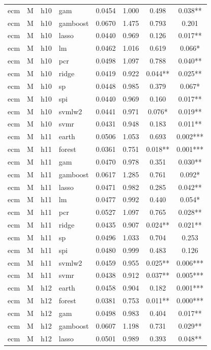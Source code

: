 \begin{ThreePartTable}
\begin{longtable}[t]{llclcccc}
ecm & M & h10 & gam & 0.0454 & 1.000 & 0.498 & 0.038**\\
ecm & M & h10 & gamboost & 0.0670 & 1.475 & 0.793 & 0.201\\
ecm & M & h10 & lasso & 0.0440 & 0.969 & 0.126 & 0.017**\\
ecm & M & h10 & lm & 0.0462 & 1.016 & 0.619 & 0.066*\\
ecm & M & h10 & pcr & 0.0498 & 1.097 & 0.788 & 0.040**\\
ecm & M & h10 & ridge & 0.0419 & 0.922 & 0.044** & 0.025**\\
ecm & M & h10 & sp & 0.0448 & 0.985 & 0.379 & 0.067*\\
ecm & M & h10 & spi & 0.0440 & 0.969 & 0.160 & 0.017**\\
ecm & M & h10 & svmlw2 & 0.0441 & 0.971 & 0.076* & 0.019**\\
ecm & M & h10 & svmr & 0.0431 & 0.948 & 0.183 & 0.011**\\
\addlinespace
ecm & M & h11 & earth & 0.0506 & 1.053 & 0.693 & 0.002***\\
ecm & M & h11 & forest & 0.0361 & 0.751 & 0.018** & 0.001***\\
ecm & M & h11 & gam & 0.0470 & 0.978 & 0.351 & 0.030**\\
ecm & M & h11 & gamboost & 0.0617 & 1.285 & 0.761 & 0.092*\\
ecm & M & h11 & lasso & 0.0471 & 0.982 & 0.285 & 0.042**\\
ecm & M & h11 & lm & 0.0477 & 0.992 & 0.440 & 0.054*\\
ecm & M & h11 & pcr & 0.0527 & 1.097 & 0.765 & 0.028**\\
ecm & M & h11 & ridge & 0.0435 & 0.907 & 0.024** & 0.021**\\
ecm & M & h11 & sp & 0.0496 & 1.033 & 0.704 & 0.253\\
ecm & M & h11 & spi & 0.0480 & 0.999 & 0.483 & 0.126\\
ecm & M & h11 & svmlw2 & 0.0459 & 0.955 & 0.025** & 0.006***\\
ecm & M & h11 & svmr & 0.0438 & 0.912 & 0.037** & 0.005***\\
\addlinespace
ecm & M & h12 & earth & 0.0458 & 0.904 & 0.182 & 0.001***\\
ecm & M & h12 & forest & 0.0381 & 0.753 & 0.011** & 0.000***\\
ecm & M & h12 & gam & 0.0498 & 0.983 & 0.404 & 0.017**\\
ecm & M & h12 & gamboost & 0.0607 & 1.198 & 0.731 & 0.029**\\
ecm & M & h12 & lasso & 0.0501 & 0.989 & 0.393 & 0.048**\\

\end{longtable}
\end{ThreePartTable}

